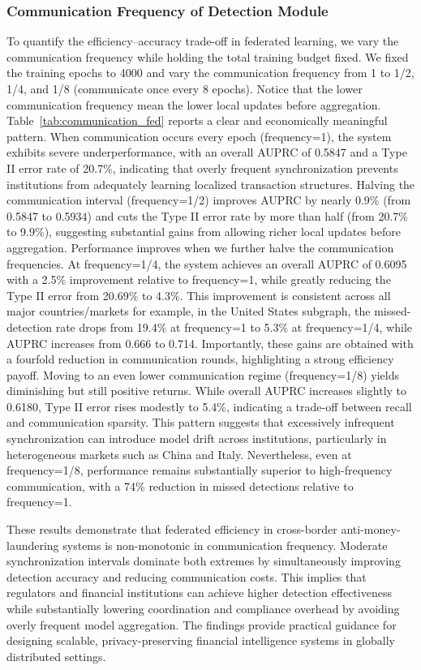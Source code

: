 \subsubsection{Communication Frequency of Detection Module}
To quantify the efficiency–accuracy trade-off in federated learning, we vary the communication frequency while holding the total training budget fixed. We fixed the training epochs to 4000 and vary the communication frequency from 1 to 1/2, 1/4, and 1/8 (communicate once every 8 epochs). Notice that the lower communication frequency mean the lower local updates before aggregation. Table~\ref{tab:communication_fed} reports a clear and economically meaningful pattern. When communication occurs every epoch (frequency=1), the system exhibits severe underperformance, with an overall AUPRC of 0.5847 and a Type II error rate of 20.7\%, indicating that overly frequent synchronization prevents institutions from adequately learning localized transaction structures. Halving the communication interval (frequency=1/2) improves AUPRC by nearly 0.9\% (from 0.5847 to 0.5934) and cuts the Type II error rate by more than half (from 20.7\% to 9.9\%), suggesting substantial gains from allowing richer local updates before aggregation. Performance improves when we further halve the communication frequencies. At frequency=1/4, the system achieves an overall AUPRC of 0.6095 with a 2.5\% improvement relative to frequency=1, while greatly reducing the Type II error from 20.69\% to 4.3\%. This improvement is consistent across all major countries/markets for example, in the United States subgraph, the missed-detection rate drops from 19.4\% at frequency=1 to 5.3\% at frequency=1/4, while AUPRC increases from 0.666 to 0.714. Importantly, these gains are obtained with a fourfold reduction in communication rounds, highlighting a strong efficiency payoff. Moving to an even lower communication regime (frequency=1/8) yields diminishing but still positive returns. While overall AUPRC increases slightly to 0.6180, Type II error rises modestly to 5.4\%, indicating a trade-off between recall and communication sparsity. This pattern suggests that excessively infrequent synchronization can introduce model drift across institutions, particularly in heterogeneous markets such as China and Italy. Nevertheless, even at frequency=1/8, performance remains substantially superior to high-frequency communication, with a 74\% reduction in missed detections relative to frequency=1.

These results demonstrate that federated efficiency in cross-border anti-money-laundering systems is non-monotonic in communication frequency. Moderate synchronization intervals dominate both extremes by simultaneously improving detection accuracy and reducing communication costs. This implies that regulators and financial institutions can achieve higher detection effectiveness while substantially lowering coordination and compliance overhead by avoiding overly frequent model aggregation. The findings provide practical guidance for designing scalable, privacy-preserving financial intelligence systems in globally distributed settings.


